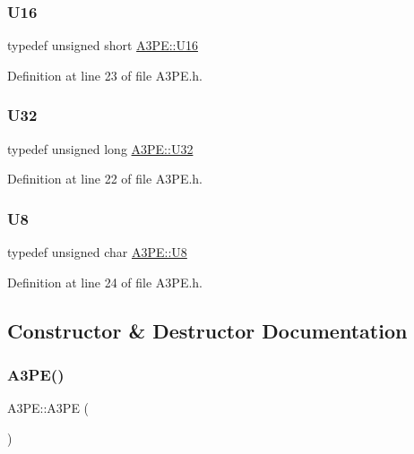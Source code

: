 \subsubsection{\texorpdfstring{U16}{U16}}
{\footnotesize\ttfamily typedef unsigned short \hyperlink{classA3PE_a2ee28b2899c3cc4f22821b4138758c28}{A3\+P\+E\+::\+U16}}



Definition at line 23 of file A3\+P\+E.\+h.

\mbox{\label{classA3PE_af2773f4a4f8e9940b1e008386c4e908c}} 
\subsubsection{\texorpdfstring{U32}{U32}}
{\footnotesize\ttfamily typedef unsigned long \hyperlink{classA3PE_af2773f4a4f8e9940b1e008386c4e908c}{A3\+P\+E\+::\+U32}}



Definition at line 22 of file A3\+P\+E.\+h.

\mbox{\label{classA3PE_ab70116c2810a9a01142a33c69fdda039}} 
\subsubsection{\texorpdfstring{U8}{U8}}
{\footnotesize\ttfamily typedef unsigned char \hyperlink{classA3PE_ab70116c2810a9a01142a33c69fdda039}{A3\+P\+E\+::\+U8}}



Definition at line 24 of file A3\+P\+E.\+h.



\subsection{Constructor \& Destructor Documentation}
\mbox{\label{classA3PE_ae3e49a43c661f5e9c1b0edaee14fc297}} 
\subsubsection{\texorpdfstring{A3\+P\+E()}{A3PE()}}
{\footnotesize\ttfamily A3\+P\+E\+::\+A3\+PE (\begin{DoxyParamCaption}{ }\end{DoxyParamCaption})\hspace{0.3cm}{\ttfamily [inline]}}




